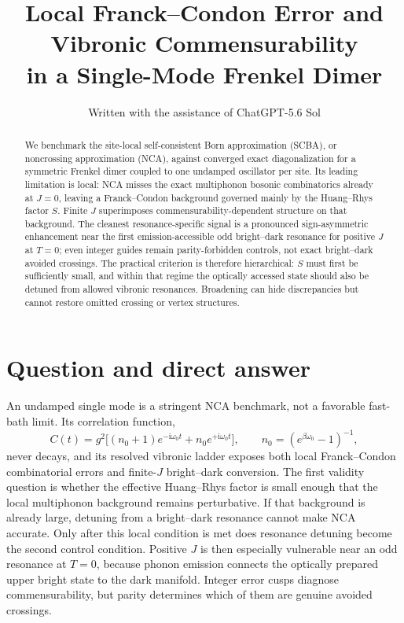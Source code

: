 \documentclass[11pt]{article}
\title{Local Franck--Condon Error and Vibronic Commensurability\\
in a Single-Mode Frenkel Dimer}
\author{Written with the assistance of ChatGPT-5.6 Sol}
\date{}
\newcommand{\ii}{\mathrm{i}}
\begin{document}
\maketitle

\begin{abstract}
We benchmark the site-local self-consistent Born approximation (SCBA), or
noncrossing approximation (NCA), against converged exact diagonalization for a
symmetric Frenkel dimer coupled to one undamped oscillator per site.  Its
leading limitation is local: NCA misses the exact multiphonon bosonic
combinatorics already at $J=0$, leaving a Franck--Condon background governed
mainly by the Huang--Rhys factor $S$.  Finite $J$ superimposes
commensurability-dependent structure on that background.  The cleanest
resonance-specific signal is a pronounced sign-asymmetric enhancement near
the first emission-accessible odd bright--dark resonance for positive $J$ at
$T=0$; even integer guides remain parity-forbidden controls, not exact
bright--dark avoided crossings.  The practical criterion is therefore
hierarchical: $S$ must first be sufficiently small, and within that regime the
optically accessed state should also be detuned from allowed vibronic
resonances.  Broadening can hide discrepancies but cannot restore omitted
crossing or vertex structures.
\end{abstract}

\section{Question and direct answer}

An undamped single mode is a stringent NCA benchmark, not a favorable
fast-bath limit.  Its correlation function,
\begin{equation}
 C(t)=g^2\big[(n_0+1)e^{-\ii\omega_0t}+n_0e^{+\ii\omega_0t}\big],
 \qquad n_0=(e^{\beta\omega_0}-1)^{-1},
\end{equation}
never decays, and its resolved vibronic ladder exposes both local
Franck--Condon combinatorial errors and finite-$J$ bright--dark conversion.
The first validity question is whether the effective Huang--Rhys factor is
small enough that the local multiphonon background remains perturbative.  If
that background is already large, detuning from a bright--dark resonance
cannot make NCA accurate.  Only after this local condition is met does
resonance detuning become the second control condition.  Positive $J$ is then
especially vulnerable near an odd resonance at $T=0$, because phonon emission
connects the optically prepared upper bright state to the dark manifold.
Integer error cusps diagnose commensurability, but parity determines which of
them are genuine avoided crossings.
\end{document}
